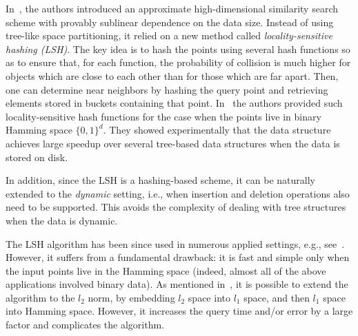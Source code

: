 \documentclass[12pt]{article}
\begin{document}
In~\cite{IM,GIM}, the authors introduced an approximate high-dimensional similarity search scheme with provably sublinear dependence on the data size.
Instead of using tree-like space partitioning, it relied on a new method called
{\em locality-sensitive hashing (LSH)}.
The key idea is to hash the points using several hash functions so as to
ensure that, for each function, the probability of collision is much higher for
objects which are close to each other than for those which are far apart.
Then, one can determine near neighbors by hashing the query point and
retrieving elements stored in buckets containing that point.
In~\cite{IM,GIM} the authors provided such locality-sensitive hash functions for the case when the points live in binary Hamming space $\{0,1\}^d$.
They showed experimentally that the data structure achieves large speedup over several tree-based data structures when the data is stored on disk.
%

%
In addition,  since the LSH is a hashing-based scheme, 
it can be naturally extended to the {\em dynamic} setting, i.e., when insertion and deletion operations also need to be supported.
This avoids the complexity of dealing with tree structures when the data is dynamic.


The LSH algorithm has been since used in numerous applied settings, 
e.g., see~\cite{GIM,eight,HGI,Shiv,Buh,BT,Ya,Buh2,OMST,GSM}.
However, it suffers from a fundamental drawback:
it is fast and simple only when the input points live in the Hamming space (indeed, almost all of the above applications  involved binary data).
As mentioned in~\cite{IM,GIM}, it is possible to extend the algorithm to the $l_2$ norm,
by embedding $l_2$ space into $l_1$ space, and then $l_1$ space into Hamming space.
However, it increases the query time and/or error by a large factor and complicates the algorithm.

\end{document}
